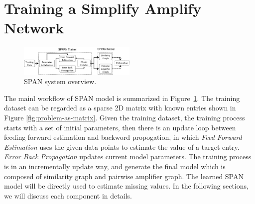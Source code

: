 \section{Training a Simplify Amplify Network}
\label{sec:trainer}

\begin{figure}[!ht]
  \centering  \includegraphics[width=0.5\textwidth]{figures/model.pdf}
  \caption{SPAN system overview.}
  \label{fig:model}
\end{figure}

The mainl workflow of SPAN model is summarized in
Figure~\ref{fig:model}.  The training dataset can be regarded as a
sparse 2D matrix with known entries shown in Figure
\ref{fig:problem-as-matrix}.  Given the training dataset, the training
process starts with a set of initial parameters, then there is an
update loop between feeding forward estimation and backword
propogation, in which {\it Feed Forward Estimation} uses the given
data points to estimate the value of a target entry.  {\it Error Back
  Propagation} updates current model parameters.  The training process
is in an incrementally update way, and generate the final model which
is composed of similarity graph and pairwise amplifier graph. The
learned SPAN model will be directly used to estimate missing values.
In the following sections, we will discuss each component in details.

